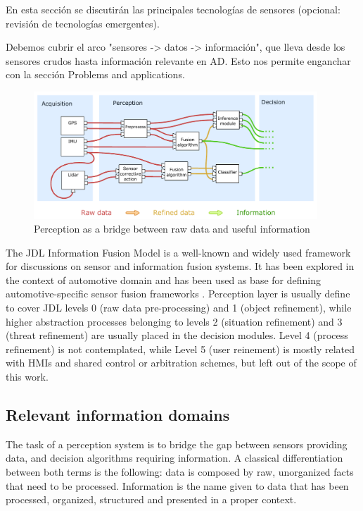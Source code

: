 
En esta sección se discutirán las principales tecnologías de sensores (opcional: revisión de tecnologías emergentes).

Debemos cubrir el arco "sensores -> datos -> información", que lleva desde los sensores crudos hasta información relevante en AD. Esto nos permite enganchar con la sección Problems and applications.

\begin{figure}[h]
    \centering
    \includegraphics[width=0.95\textwidth]{"img/data_vs_information"}
    \caption{Perception as a bridge between raw data and useful information}
    \label{fig:data-vs-information}
\end{figure}

The JDL Information Fusion Model \cite{Llinas2000} is a well-known and 
widely used framework for discussions on sensor and information fusion systems.
It has been explored in the context of automotive domain
\cite{Polychronopoulos2006} and has been used as base for defining
automotive-specific sensor fusion frameworks \cite{Tatschke2006}. 
Perception layer is usually define to cover JDL levels 0 (raw data
pre-processing) and 1 (object refinement), while higher abstraction processes
belonging to levels 2 (situation refinement) and 3 (threat refinement) are
usually placed in the decision modules.
Level 4 (process refinement) is not contemplated, while Level 5 (user reinement)
is mostly related with HMIs and shared control or arbitration schemes, but
left out of the scope of this work.


\subsection{Relevant information domains}

The task of a perception system is to bridge the gap between sensors providing 
data, and decision algorithms requiring information.
A classical differentiation between both terms is the following: data is 
composed by raw, unorganized facts that need to be processed. 
Information is the name given to data that has been processed, organized, 
structured and presented in a proper context.

